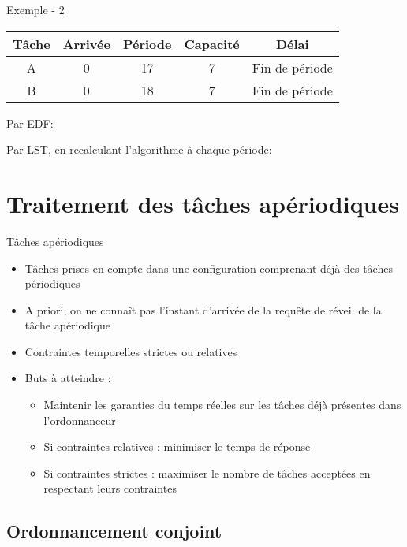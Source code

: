 \begin{frame}{Exemple - 2}
  \begin{center}
    \begin{tabular}{ccccc}
      \hline
      Tâche & Arrivée & Période & Capacité & Délai \\
      \hline
      A & 0 & 17 & 7 & Fin de période\\
      B & 0 & 18 & 7 & Fin de période\\
      \hline
    \end{tabular}
  \end{center}
  Par EDF:
  \pause
  \begin{center}  
    
  \end{center}
  Par LST, en recalculant l'algorithme à chaque période:
  \pause
  \begin{center}  
    
  \end{center}
\end{frame} 

\section{Traitement des tâches apériodiques}

\begin{frame}{Tâches apériodiques} 
  \begin{itemize}
  \item Tâches prises en compte dans une configuration comprenant déjà
    des tâches périodiques
  \item A priori, on ne  connaît pas l'instant d'arrivée de la requête
    de réveil de la tâche apériodique
  \item Contraintes temporelles strictes ou relatives 
  \item Buts à atteindre : 
    \begin{itemize}
    \item Maintenir les garanties du temps réelles sur les tâches déjà
      présentes dans l'ordonnanceur
    \item Si contraintes relatives : minimiser le temps de réponse
    \item  Si contraintes  strictes :  maximiser le  nombre  de tâches
      acceptées en respectant leurs contraintes
    \end{itemize}
  \end{itemize}
\end{frame}

\subsection{Ordonnancement conjoint}

